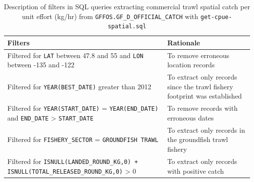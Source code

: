 \documentclass[11pt]{book}\usepackage[]{graphicx}\usepackage[]{color}
\begin{document}
\begin{table}[htpb]
\centering
\caption{Description of filters in SQL queries extracting commercial trawl spatial catch per unit effort (kg/hr) from \texttt{GFFOS.GF\_D\_OFFICIAL\_CATCH} with \texttt{get-cpue-spatial.sql}}
\label{tab:sql-cpue-spatial}
{\tabulinesep=1.6mm
\begin{tabu}{>{\raggedright\arraybackslash}m{2.8in}>{\raggedright\arraybackslash}m{3.2in}}
\toprule
Filters                                                                                                            & Rationale                                                                 \\
\midrule
Filtered for \texttt{LAT} between 47.8 and 55 and \texttt{LON} between -135 and -122                               & To remove erroneous location records                                      \\
Filtered for \texttt{YEAR(BEST\_DATE)} greater than 2012                                                           & To extract only records since the trawl fishery footprint was established \\
Filtered for \texttt{YEAR(START\_DATE)} = \texttt{YEAR(END\_DATE)} and \texttt{END\_DATE} > \texttt{START\_DATE}   & To remove records with erroneous dates                                    \\
Filtered for \texttt{FISHERY\_SECTOR} = \texttt{GROUNDFISH TRAWL}                                                   & To extract only records in the groundfish trawl fishery                   \\
Filtered for \texttt{ISNULL(LANDED\_ROUND\_KG,0) + ISNULL(TOTAL\_RELEASED\_ROUND\_KG,0)} > 0                            & To extract only records with positive catch                               \\
\bottomrule
\end{tabu}}
\end{table}
\end{document}
